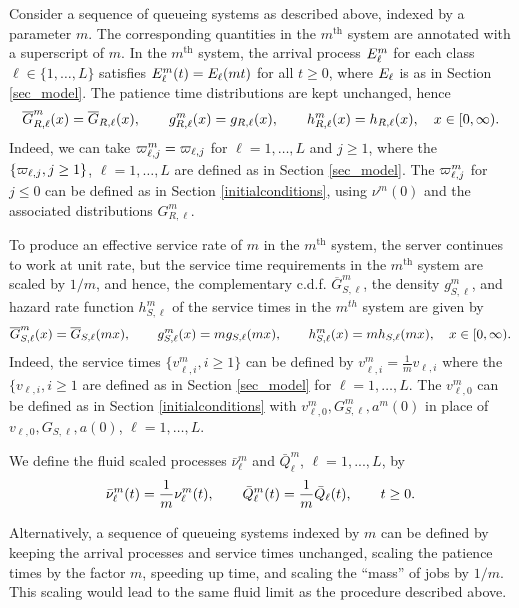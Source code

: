\documentclass[stsy]{informs-stsy}
\begin{document}
Consider a sequence of queueing systems as described above, indexed by a parameter $m$. The corresponding quantities in the $m^\text{th}$ system are annotated with a superscript of $m$. In the $m^\text{th}$ system,  the arrival process $E^m_\ell$ for each class $\ell\in \{ 1, \ldots, L\}$ satisfies $E^m_\ell(t)=E_\ell(mt) $ for all $t\geq 0$, where $E_\ell$ is as in Section
\ref{sec_model}.
 The patience time distributions are kept unchanged, hence
\[
    \overline G^m_{R,\ell}(x)=\overline G_{R,\ell}(x),\quad\quad g^m_{R,\ell}(x)=g_{R,\ell}(x),\quad\quad h^m_{R,\ell}(x)=h_{R,\ell}(x),\quad x\in[0,\infty).
\]
Indeed, we can take $ \varpi^m_{\ell, j}= \varpi_{\ell, j}$ for $\ell =1, \ldots, L$ and $j\geq 1$, where the $\{\varpi_{\ell, j}, j\geq 1 \}$, $\ell =1, \ldots, L$ are defined as in 
Section \ref{sec_model}. The $\varpi^m_{\ell, j} $ for $j\leq 0$ can be defined as in Section \ref{initialconditions}, using $\nu^m(0)$ and the associated distributions $G^m_{R, \ell}$. 

To produce an effective service rate of $m$ in the $m^{\text{th}}$ system, the server continues to work at unit rate, but 
the service time requirements in the $m^\text{th}$ system are scaled by $1/m$, and hence, the complementary c.d.f. $\overline G^m_{S,\ell}$, the density $g^m_{S,\ell}$, and hazard rate function $h^m_{S,\ell}$ of the service times in the $m^{th}$ system are given by
\[
    \overline G^m_{S,\ell}(x)=\overline G_{S,\ell}(mx),\quad\quad g^m_{S,\ell}(x)=m g_{S,\ell}(mx),\quad\quad h^m_{S,\ell}(x)=mh_{S,\ell}(mx),\quad x\in[0,\infty).
\]
Indeed, the service times $\{  v^m_{\ell, i} , i\geq 1\}$ can be defined by 
 $v^m_{\ell, i} =\frac{1}{m} v_{\ell, i}$ where the $\{v_{\ell, i}, i\geq 1$ are defined as in Section \ref{sec_model} for $\ell =1, \ldots, L$.
 The $ v^m_{\ell, 0} $ can be defined as in Section \ref{initialconditions} with $ v^m_{\ell, 0}, G^m_{S,\ell}, a^m(0)$  in place of $ v_{\ell, 0}, G_{S,\ell},a(0)$, $\ell =1, \ldots, L$.

We define the fluid scaled processes $\bar\nu^m_\ell$ and  $\bar Q_\ell^m$, $\ell=1,...,L$, by
\[
    \bar\nu^m_\ell(t)=\frac{1}{m}\nu^m_\ell(t),\quad\quad \bar {Q}^m_\ell(t)=\frac{1}{m}\bar {Q}_\ell(t),\quad\quad t\geq0.
\]


\begin{remark}
 Alternatively, a sequence of queueing systems indexed by $m$ can be defined by keeping the arrival processes and service times unchanged, scaling the patience times by the factor $m$, speeding up time, and scaling the ``mass'' of jobs by $1/m$. This scaling would lead to the same fluid limit as the procedure described above.
\end{remark}
\end{document}
